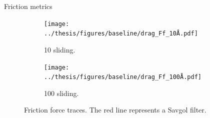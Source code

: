 \documentclass[
	10pt, %
]{beamer}
\begin{document}
\begin{frame}{Friction metrics}
	\begin{figure}[H]
	\centering
	\begin{subfigure}[t]{0.49\textwidth}
		\centering
		\texttt{[image: ../thesis/figures/baseline/drag\_Ff\_10Å.pdf]}
		\caption{\SI{10}{} sliding.}
	\end{subfigure}
	\hfill
	\begin{subfigure}[t]{0.49\textwidth}
		\centering
		\texttt{[image: ../thesis/figures/baseline/drag\_Ff\_100Å.pdf]}
		\caption{\SI{100}{} sliding.}
	  \end{subfigure}
	   \caption{Friction force traces. The red line represents a Savgol filter.}
  \end{figure}
\end{frame}
\end{document}
